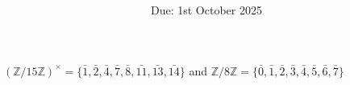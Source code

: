 \documentclass[12pt]{article}
\title{\textbf{\mytitle}}
\author{\textbf{\myauthor}}
\date{Due: 1st October 2025}
\begin{document}
\onehalfspacing
\maketitle

\section{} %
\subsection{} %
$(\mathbb{Z}/15\mathbb{Z})^{\times}=\{\bar{1},\bar{2},\bar{4},\bar{7},\bar{8},\bar{11},\bar{13},\bar{14}\}$ and $\mathbb{Z}/8\mathbb{Z}=\{\bar{0},\bar{1},\bar{2},\bar{3},\bar{4},\bar{5},\bar{6},\bar{7}\}$
\subsection{} %
\subsection{} %
\subsection{} %
\subsection{} %
\subsection{} %
\subsection{} %
\subsection{} %

\newpage
\section{} %

\newpage
\section{} %
\subsection{}
\subsection{}

\newpage
\section{} %
\end{document}
